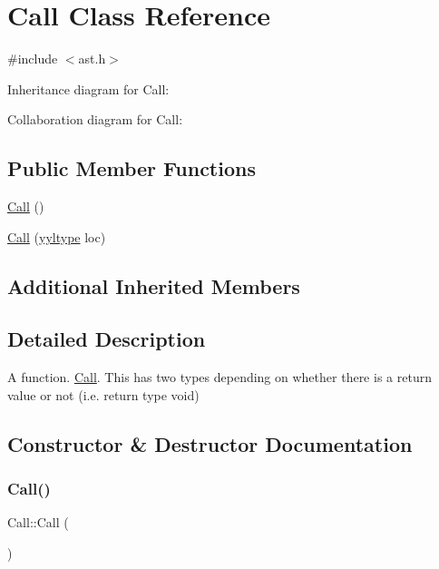 \hypertarget{class_call}{}\section{Call Class Reference}
\label{class_call}


{\ttfamily \#include $<$ast.\+h$>$}



Inheritance diagram for Call\+:


Collaboration diagram for Call\+:
\subsection*{Public Member Functions}
\begin{DoxyCompactItemize}
\item 
\hyperlink{class_call_a7fdd4cfe0b5f415e20d390bcc906c7cd}{Call} ()
\item 
\hyperlink{class_call_a3f36557e042b3913d540207d8243a2ca}{Call} (\hyperlink{structyyltype}{yyltype} loc)
\end{DoxyCompactItemize}
\subsection*{Additional Inherited Members}


\subsection{Detailed Description}
A function. \hyperlink{class_call}{Call}. This has two types depending on whether there is a return value or not (i.\+e. return type void) 

\subsection{Constructor \& Destructor Documentation}
\mbox{\label{class_call_a7fdd4cfe0b5f415e20d390bcc906c7cd}} 
\subsubsection{\texorpdfstring{Call()}{Call()}\hspace{0.1cm}{\footnotesize\ttfamily [1/2]}}
{\footnotesize\ttfamily Call\+::\+Call (\begin{DoxyParamCaption}{ }\end{DoxyParamCaption})\hspace{0.3cm}{\ttfamily [inline]}}

